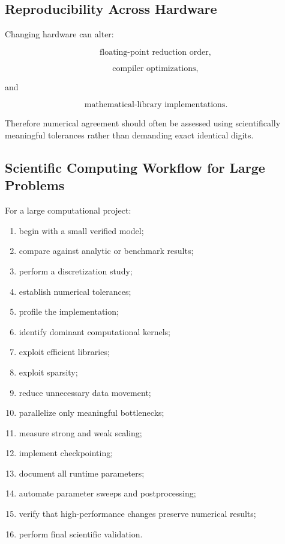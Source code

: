 \subsection{Reproducibility Across Hardware}
\label{subsec:reproducibility-across-hardware}

Changing hardware can alter:

\[
\boxed{
\text{floating-point reduction order},
}
\]

\[
\boxed{
\text{compiler optimizations},
}
\]

and

\[
\boxed{
\text{mathematical-library implementations}.
}
\]

Therefore numerical agreement should often be assessed using scientifically
meaningful tolerances rather than demanding exact identical digits.

\subsection{Scientific Computing Workflow for Large Problems}
\label{subsec:large-scientific-computing-workflow}

For a large computational project:

\begin{enumerate}
    \item begin with a small verified model;
    \item compare against analytic or benchmark results;
    \item perform a discretization study;
    \item establish numerical tolerances;
    \item profile the implementation;
    \item identify dominant computational kernels;
    \item exploit efficient libraries;
    \item exploit sparsity;
    \item reduce unnecessary data movement;
    \item parallelize only meaningful bottlenecks;
    \item measure strong and weak scaling;
    \item implement checkpointing;
    \item document all runtime parameters;
    \item automate parameter sweeps and postprocessing;
    \item verify that high-performance changes preserve numerical results;
    \item perform final scientific validation.
\end{enumerate}

